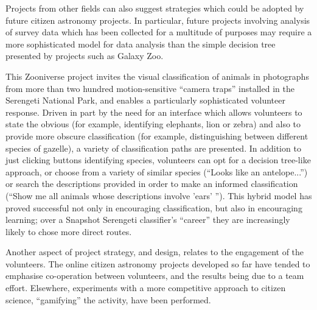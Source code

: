 \documentclass{ar2e}
\begin{document}
Projects from other fields can also suggest strategies which could be adopted
by future citizen astronomy projects. In particular, future projects involving
analysis of survey data which has been collected for a multitude of purposes
may require a more sophisticated model for data analysis than the simple
decision tree presented by projects such as Galaxy Zoo. 


This Zooniverse project invites the visual classification of animals in
photographs from more than two hundred motion-sensitive ``camera traps''
installed in the Serengeti National Park, and enables a particularly
sophisticated volunteer response. Driven in part by the need for an interface
which allows volunteers to state the obvious (for example, identifying
elephants, lion or zebra) and also to provide more obscure classification (for
example, distinguishing between different species of gazelle),  a variety of
classification paths are presented. In addition to just clicking buttons
identifying species, volunteers can opt for a decision tree-like approach, or
choose from a variety of similar species (``Looks like an antelope...'') or
search the descriptions provided in order to make an informed  classification
(``Show me all animals whose descriptions involve 'ears' ''). This hybrid model
has proved successful not only in encouraging classification, but also in
encouraging learning; over a Snapshot Serengeti classifier's ``career'' they are
increasingly likely to chose more direct routes.



Another aspect of project strategy, and design, relates to the engagement of the
volunteers. The online citizen astronomy projects developed so far have tended
to emphasise co-operation between volunteers, and the results being due to a
team effort. Elsewhere, experiments with a more competitive approach to citizen
science, ``gamifying'' the activity, have been performed.
\end{document}
